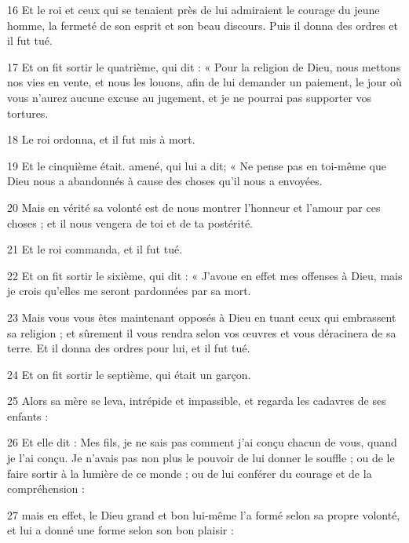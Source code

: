 \par 16 Et le roi et ceux qui se tenaient près de lui admiraient le courage du jeune homme, la fermeté de son esprit et son beau discours. Puis il donna des ordres et il fut tué.

\par 17 Et on fit sortir le quatrième, qui dit : « Pour la religion de Dieu, nous mettons nos vies en vente, et nous les louons, afin de lui demander un paiement, le jour où vous n'aurez aucune excuse au jugement, et je ne pourrai pas supporter vos tortures.

\par 18 Le roi ordonna, et il fut mis à mort.

\par 19 Et le cinquième était. amené, qui lui a dit; « Ne pense pas en toi-même que Dieu nous a abandonnés à cause des choses qu'il nous a envoyées.

\par 20 Mais en vérité sa volonté est de nous montrer l'honneur et l'amour par ces choses ; et il nous vengera de toi et de ta postérité.

\par 21 Et le roi commanda, et il fut tué.

\par 22 Et on fit sortir le sixième, qui dit : « J'avoue en effet mes offenses à Dieu, mais je crois qu'elles me seront pardonnées par sa mort.

\par 23 Mais vous vous êtes maintenant opposés à Dieu en tuant ceux qui embrassent sa religion ; et sûrement il vous rendra selon vos œuvres et vous déracinera de sa terre. Et il donna des ordres pour lui, et il fut tué.

\par 24 Et on fit sortir le septième, qui était un garçon.

\par 25 Alors sa mère se leva, intrépide et impassible, et regarda les cadavres de ses enfants :

\par 26 Et elle dit : Mes fils, je ne sais pas comment j'ai conçu chacun de vous, quand je l'ai conçu. Je n’avais pas non plus le pouvoir de lui donner le souffle ; ou de le faire sortir à la lumière de ce monde ; ou de lui conférer du courage et de la compréhension :

\par 27 mais en effet, le Dieu grand et bon lui-même l'a formé selon sa propre volonté, et lui a donné une forme selon son bon plaisir :

